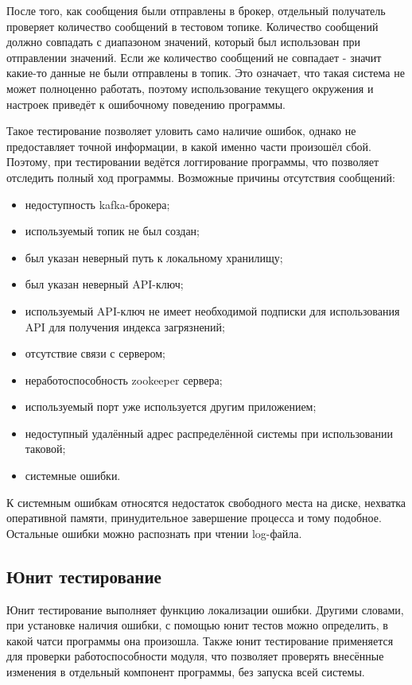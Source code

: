 После того, как сообщения были отправлены в брокер, отдельный получатель проверяет количество сообщений в тестовом топике.
Количество сообщений должно совпадать с диапазоном значений, который был использован при отправлении значений.
Если же количество сообщений не совпадает - значит какие-то данные не были отправлены в топик.
Это означает, что такая система не может полноценно работать, поэтому использование текущего окружения и настроек приведёт к ошибочному поведению программы.

Такое тестирование позволяет уловить само наличие ошибок, однако не предоставляет точной информации, в какой именно части произошёл сбой.
Поэтому, при тестировании ведётся логгирование программы, что позволяет отследить полный ход программы.
Возможные причины отсутствия сообщений:
\begin{itemize}
    \item недоступность kafka-брокера;
    \item используемый топик не был создан;
    \item был указан неверный путь к локальному хранилищу;
    \item был указан неверный API-ключ;
    \item используемый API-ключ не имеет необходимой подписки для использования API для получения индекса загрязнений;
    \item отсутствие связи с сервером;
    \item неработоспособность zookeeper сервера;
    \item используемый порт уже используется другим приложением;
    \item недоступный удалённый адрес распределённой системы при использовании таковой;
    \item системные ошибки.
\end{itemize}

К системным ошибкам относятся недостаток свободного места на диске, нехватка оперативной памяти, принудительное завершение процесса и тому подобное.
Остальные ошибки можно распознать при чтении log-файла.


\subsection{Юнит тестирование}
Юнит тестирование выполняет функцию локализации ошибки.
Другими словами, при установке наличия ошибки, с помощью юнит тестов можно определить, в какой чатси программы она произошла.
Также юнит тестирование применяется для проверки работоспособности модуля, что позволяет проверять внесённые изменения в отдельный компонент программы, без запуска всей системы.

